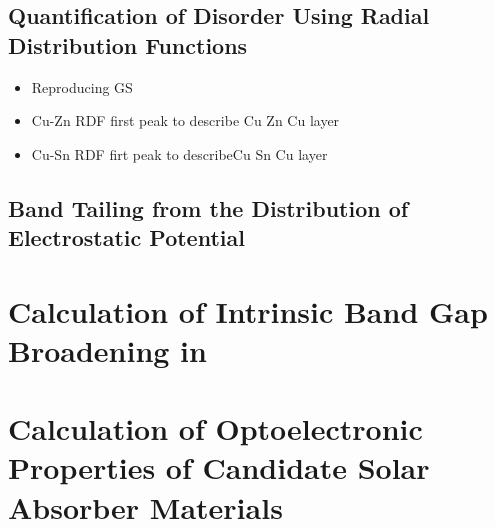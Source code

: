 \subsection{Quantification of Disorder Using Radial Distribution Functions}
\begin{itemize}
\item Reproducing GS
\item Cu-Zn RDF first peak to describe Cu Zn Cu layer
\item Cu-Sn RDF firt peak to describeCu Sn Cu layer
\end{itemize}


\subsection{Band Tailing from the Distribution of Electrostatic Potential}


\section{Calculation of Intrinsic Band Gap Broadening in \CZTS}


\section{Calculation of Optoelectronic Properties of Candidate Solar Absorber Materials}

                            